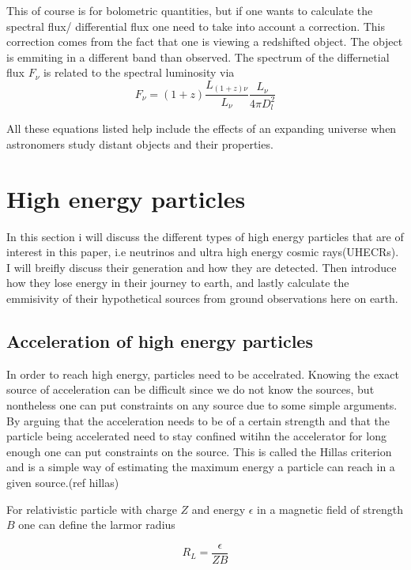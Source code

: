 \documentclass{article}
\begin{document}
This of course is for bolometric quantities, but if one wants to calculate the spectral 
flux/ differential flux one need to take into account a correction. This correction comes 
from the fact that one is viewing a redshifted object. The object is emmiting in a different band than 
observed. The spectrum of the differnetial flux $F_\nu$ is related to the spectral luminosity via
\begin{equation}
    F_\nu = (1+z) \frac{L_{(1+z)\nu}}{L_\nu}\frac{L_\nu}{4\pi D_l^2}
\end{equation}


All these equations listed help include the effects of an expanding universe when astronomers study distant objects and their properties. 

\section{High energy particles}
In this section i will discuss the different types of high energy particles that are of interest in this paper, i.e neutrinos and ultra high energy cosmic rays(UHECRs).
I will breifly discuss their generation and how they are detected. Then introduce how they lose energy in their journey to earth, and lastly calculate the emmisivity of their hypothetical sources from ground 
observations here on earth. 

\subsection{Acceleration of high energy particles}

In order to reach high energy, particles need to be accelrated. 
Knowing the exact source of acceleration can be difficult since we do not know the sources, but nontheless one can put constraints on any source due to some simple arguments.
By arguing that the acceleration needs to be of a certain strength and that the particle being accelerated need to stay confined witihn the accelerator for long enough one can put constraints on the source.
This is called the Hillas criterion and is a simple way of estimating the maximum energy a particle can reach in a given source.(ref hillas)

For relativistic particle with charge $Z$ and energy $\epsilon$ in a magnetic field of strength $B$ one can define the larmor radius


\begin{equation}
    R_L = \frac{\epsilon}{ZB}
\end{equation}
\end{document}
